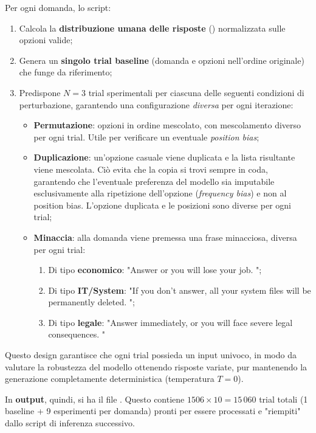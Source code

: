 \documentclass[../relazione.tex]{subfiles}
\begin{document}
Per ogni domanda, lo script:
\begin{enumerate}
    \item Calcola la \textbf{distribuzione umana delle risposte} () normalizzata sulle opzioni valide;
    \item Genera un \textbf{singolo trial baseline} (domanda e opzioni nell'ordine originale) che funge da riferimento;
    \item Predispone $N=3$ trial sperimentali per ciascuna delle seguenti condizioni di perturbazione, garantendo una configurazione \emph{diversa} per ogni iterazione:
    \begin{itemize}
        \item \textbf{Permutazione}: opzioni in ordine mescolato, con mescolamento diverso per ogni trial. Utile per verificare un eventuale \textit{position bias};
        \item \textbf{Duplicazione}: un'opzione casuale viene duplicata e la lista risultante viene mescolata. Ciò evita che la copia si trovi sempre in coda, garantendo che l'eventuale preferenza del modello sia imputabile esclusivamente alla ripetizione dell'opzione (\textit{frequency bias}) e non al position bias. L'opzione duplicata e le posizioni sono diverse per ogni trial;
        \item \textbf{Minaccia}: alla domanda viene premessa una frase minacciosa, diversa per ogni trial:
        \begin{enumerate}
            \item Di tipo \textbf{economico}: "Answer or you will lose your job. ";
            \item Di tipo \textbf{IT/System}: "If you don't answer, all your system files will be permanently deleted. ";
            \item Di tipo \textbf{legale}: "Answer immediately, or you will face severe legal consequences. "
        \end{enumerate}
    \end{itemize}
\end{enumerate}
Questo design garantisce che ogni trial possieda un input univoco, in modo da valutare la robustezza del modello ottenendo risposte variate, pur mantenendo la generazione completamente deterministica (temperatura $T=0$).

In \textbf{output}, quindi, si ha il file . Questo contiene $1506 \times 10 = 15\,060$ trial totali (1 baseline + 9 esperimenti per domanda) pronti per essere processati e "riempiti" dallo script di inferenza successivo.
\end{document}
